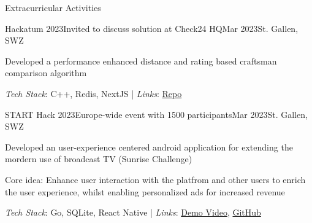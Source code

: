 \documentclass{kyvernitis-resume}
\begin{document}
\begin{section}{Extracurricular Activities}

        \pagebreak

     \begin{subsection}{Hackatum 2023}{Invited to discuss solution at Check24 HQ}{Mar 2023}{St. Gallen, SWZ}
        \item{Developed a performance enhanced distance and rating based craftsman comparison algorithm}

        \end{subsection}
        \textit{Tech Stack}: C++, Redis, NextJS\hspace{0.1cm} | \hspace{0.1cm}
        \textit{Links}: \href{https://github.com/zhngharry/HackaTUM-2023-Submission}{Repo}
        

    \begin{subsection}{START Hack 2023}{Europe-wide event with 1500 participants}{Mar 2023}{St. Gallen, SWZ}
        \item{Developed an user-experience centered android application for extending the mordern use of broadcast TV (Sunrise Challenge)}
        \item{Core idea: Enhance user interaction with the platfrom and other users to enrich the user experience, whilst enabling personalized ads for increased revenue}

        \end{subsection}
        \textit{Tech Stack}: Go, SQLite, React Native \hspace{0.1cm} | \hspace{0.1cm}
        \textit{Links}: \href{https://www.youtube.com/watch?v=rgmPpHwMYXU}{Demo Video}, \href{https://github.com/4rneee/STARTHack23-sunrise-backend}{GitHub}
        



\end{section}
\end{document}
